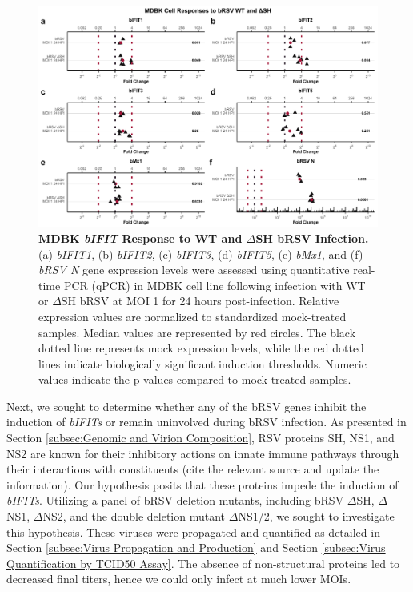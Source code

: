 \begin{figure}
    \centering
    \includegraphics[width=1\linewidth]{07. Chapter 2/Figs/02. Induction/05. mdbk_brsv_moi1_dsh.pdf}
    \caption[MDBK \textit{bIFIT} Response to WT and \(\Delta\)SH bRSV Infection.]{\textbf{MDBK \textit{bIFIT} Response to WT and \(\Delta\)SH bRSV Infection.} (a) \textit{bIFIT1}, (b) \textit{bIFIT2}, (c) \textit{bIFIT3}, (d) \textit{bIFIT5}, (e) \textit{bMx1}, and (f) \textit{bRSV N} gene expression levels were assessed using quantitative real-time PCR (qPCR) in MDBK cell line following infection with WT or \(\Delta\)SH bRSV at MOI 1 for 24 hours post-infection. Relative expression values are normalized to standardized mock-treated samples. Median values are represented by red circles. The black dotted line represents mock expression levels, while the red dotted lines indicate biologically significant induction thresholds. Numeric values indicate the p-values compared to mock-treated samples.}
    \label{fig:MDBK responses to dSH}
\end{figure}

Next, we sought to determine whether any of the bRSV genes inhibit the induction of \textit{bIFITs} or remain uninvolved during bRSV infection. As presented in Section \ref{subsec:Genomic and Virion Composition}, RSV proteins SH, NS1, and NS2 are known for their inhibitory actions on innate immune pathways through their interactions with constituents (cite the relevant source and update the information). Our hypothesis posits that these proteins impede the induction of \textit{bIFITs}. Utilizing a panel of bRSV deletion mutants, including bRSV \(\Delta\)SH, \(\Delta\)NS1, \(\Delta\)NS2, and the double deletion mutant \(\Delta\)NS1/2, we sought to investigate this hypothesis. These viruses were propagated and quantified as detailed in Section \ref{subsec:Virus Propagation and Production} and Section \ref{subsec:Virus Quantification by TCID50 Assay}. The absence of non-structural proteins led to decreased final titers, hence we could only infect at much lower MOIs.

